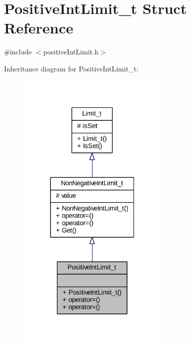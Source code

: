 \hypertarget{struct_positive_int_limit__t}{}\section{Positive\+Int\+Limit\+\_\+t Struct Reference}
\label{struct_positive_int_limit__t}


{\ttfamily \#include $<$positive\+Int\+Limit.\+h$>$}



Inheritance diagram for Positive\+Int\+Limit\+\_\+t\+:
\nopagebreak
\begin{figure}[H]
\begin{center}
\leavevmode
\includegraphics[width=205pt]{struct_positive_int_limit__t__inherit__graph}
\end{center}
\end{figure}


